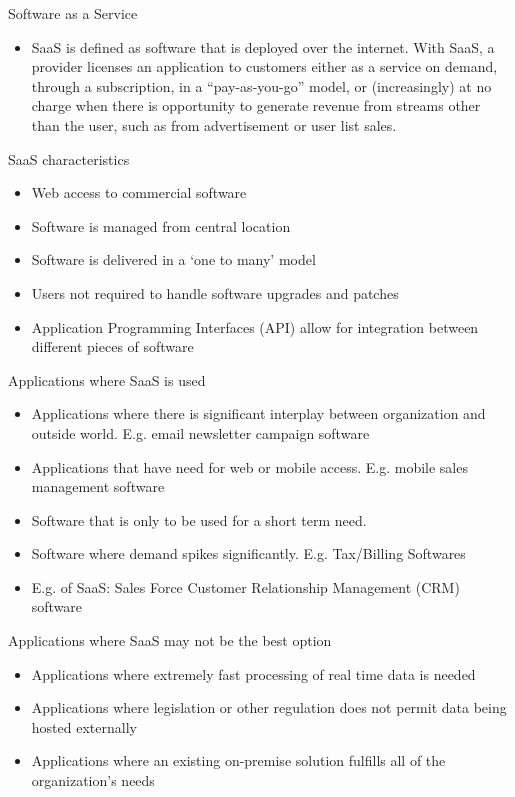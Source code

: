 \documentclass{SKP-beamer}
\begin{document}
\begin{frame}{Software as a Service}
	\begin{itemize}
		\item SaaS is defined as software that is deployed over the internet. With SaaS, a provider licenses an application to customers either as a service on demand, through a subscription, in a “pay-as-you-go” model, or (increasingly) at no charge when there is opportunity to generate revenue from streams other than the user, such as from advertisement or user list sales.
	\end{itemize}
\end{frame} 

\begin{frame}{SaaS characteristics}
	\begin{itemize}
		\item Web access to commercial software
		\item Software is managed from central location
		\item Software is delivered in a ‘one to many’ model
		\item Users not required to handle software upgrades and patches
		\item Application Programming Interfaces (API) allow for integration between different pieces of software
	\end{itemize}
\end{frame} 

\begin{frame}{Applications where SaaS is used}
	\begin{itemize}
		\item Applications where there is significant interplay between organization and outside world. E.g. email newsletter campaign software
		\item Applications that have need for web or mobile access. E.g. mobile sales management software
		\item Software that is only to be used for a short term need.
		\item Software where demand spikes significantly. E.g. Tax/Billing Softwares
		\item E.g. of SaaS: Sales Force Customer Relationship Management (CRM) software
	\end{itemize}
\end{frame} 


\begin{frame}{Applications where SaaS may not be the best option}
	\begin{itemize}
		\item Applications where extremely fast processing of real time data is needed
		\item Applications where legislation or other regulation does not permit data being hosted externally
		\item Applications where an existing on-premise solution fulfills all of the organization’s needs
	\end{itemize}
\end{frame} 
\end{document}
